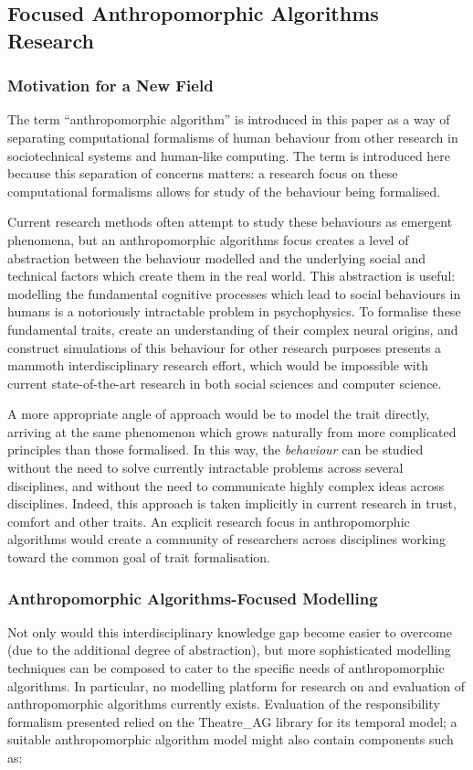 \subsection{Focused Anthropomorphic Algorithms Research}
\subsubsection{Motivation for a New Field}
The term ``anthropomorphic algorithm'' is introduced in this paper as a way of separating computational formalisms of human behaviour from other research in sociotechnical systems and human-like computing. The term is introduced here because this separation of concerns matters: a research focus on these computational formalisms allows for study of the behaviour being formalised.\par

Current research methods often attempt to study these behaviours as emergent phenomena, but an anthropomorphic algorithms focus creates a level of abstraction between the behaviour modelled and the underlying social and technical factors which create them in the real world. This abstraction is useful: modelling the fundamental cognitive processes which lead to social behaviours in humans is a notoriously intractable problem in psychophysics. To formalise these fundamental traits, create an understanding of their complex neural origins, and construct simulations of this behaviour for other research purposes presents a mammoth interdisciplinary research effort, which would be impossible with current state-of-the-art research in both social sciences and computer science.\par

A more appropriate angle of approach would be to model the trait directly, arriving at the same phenomenon which grows naturally from more complicated principles than those formalised. In this way, the \emph{behaviour} can be studied without the need to solve currently intractable problems across several disciplines, and without the need to communicate highly complex ideas across disciplines. Indeed, this approach is taken implicitly in current research in trust, comfort and other traits. An explicit research focus in anthropomorphic algorithms would create a community of researchers across disciplines working toward the common goal of trait formalisation.\par

\subsubsection{Anthropomorphic Algorithms-Focused Modelling}
Not only would this interdisciplinary knowledge gap become easier to overcome (due to the additional degree of abstraction), but more sophisticated modelling techniques can be composed to cater to the specific needs of anthropomorphic algorithms. In particular, no modelling platform for research on and evaluation of anthropomorphic algorithms currently exists. Evaluation of the responsibility formalism presented relied on the Theatre\_AG library for its temporal model; a suitable anthropomorphic algorithm model might also contain components such as:

